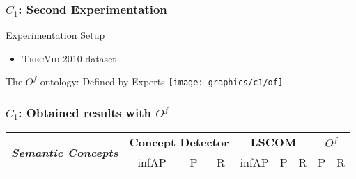 \begin{frame}
	\frametitle{$C_{1}$: Second Experimentation}
	\small
	\begin{exampleblock}{Experimentation Setup}
		\begin{itemize}
			\item \textsc{TrecVid 2010} dataset
		  \end{itemize}
	\end{exampleblock}
	\begin{exampleblock}{The $O^{f}$ ontology: Defined by Experts}
		\centering \texttt{[image: graphics/c1/of]}
	\end{exampleblock}
\end{frame}

\begin{frame}
	\frametitle{$C_{1}$: Obtained results with $O^{f}$}
	\centering
	\tiny
		\begin{tabular}{l||ccc|ccc|cc}\hline
				\multirow{2}{*}{\textit{\textbf{Semantic Concepts}}} & 	
				\multicolumn{3}{c}{\textbf{Concept Detector}} & 
				\multicolumn{3}{c}{\textbf{LSCOM}}&
				\multicolumn{2}{c}{\textbf{\alert{$O^{f}$}}}\\ 

				& infAP & P & R & infAP & P & R & P & R\\
				\hline
				\hline
	

\end{tabular}
\end{frame}
